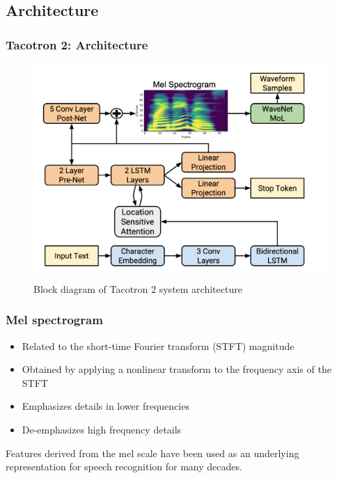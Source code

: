 \documentclass{beamer}
\begin{document}
  \subsection{Architecture}
  \begin{frame}
    \frametitle{Tacotron 2: Architecture}
    \begin{figure}
      \includegraphics[scale=0.25]{images/tacotron_arch.png}
      \caption{Block diagram of Tacotron 2 system architecture}
    \end{figure}
  \end{frame}

  \begin{frame}
    \frametitle{Mel spectrogram}
      \begin{itemize}
        \item Related to the short-time Fourier transform (STFT) magnitude 
        \item Obtained by applying a nonlinear transform to the frequency axis of the STFT
        \item Emphasizes details in lower frequencies
        \item De-emphasizes high frequency details
      \end{itemize}
      Features derived from the mel scale have been used as an underlying representation for speech recognition for many decades. 
  \end{frame}
\end{document}
